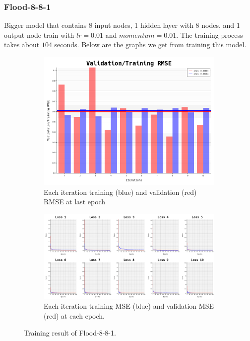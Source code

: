 \documentclass{article}
\begin{document}
\subsubsection*{Flood-8-8-1}
Bigger model that contains 8 input nodes, 1 hidden layer with 8 nodes, and 1 output node train with $lr = 0.01$ and $momentum = 0.01$.
The training process takes about $104$ seconds.
Below are the graphs we get from training this model. 
\begin{figure}[ht]
	\begin{subfigure}{\textwidth}
		\centering
		\includegraphics[scale=0.3]{flood-8-8-1/cv_l}
		\caption{Each iteration training (blue) and validation (red) RMSE at last epoch}
		\label{fig:6a}
	\end{subfigure}
	\begin{subfigure}{\textwidth}
		\includegraphics[width=\textwidth]{flood-8-8-1/loss}
		\caption{Each iteration training MSE (blue) and validation MSE (red) at each epoch.}
		\label{fig:6b}
	\end{subfigure}
	\caption{Training result of Flood-8-8-1.}
	\label{fig:6}
\end{figure}
\FloatBarrier
\end{document}
